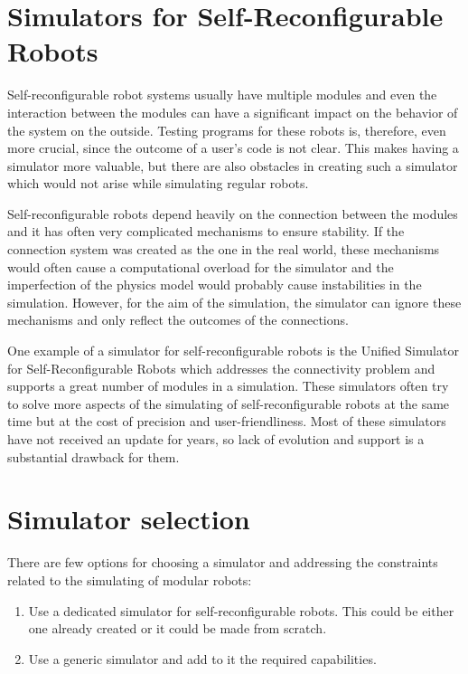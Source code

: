 \documentclass[
  printed, %
  color,   %
  notable, %
  oneside, %
  nolof,   %
  nolot,   %
  nocover,
]{fithesis3}
\begin{document}
\section{Simulators for Self-Reconfigurable Robots}

Self-reconfigurable robot systems usually have multiple modules and even the interaction between the modules can have a significant impact on the behavior of the system on the outside.
Testing programs for these robots is, therefore, even more crucial, since the outcome of a user's code is not clear.
This makes having a simulator more valuable, but there are also obstacles in creating such a simulator which would not arise while simulating regular robots.

Self-reconfigurable robots depend heavily on the connection between the modules and it has often very complicated mechanisms to ensure stability.
If the connection system was created as the one in the real world, these mechanisms would often cause a computational overload for the simulator and the imperfection of the physics model would probably cause instabilities in the simulation.
However, for the aim of the simulation, the simulator can ignore these mechanisms and only reflect the outcomes of the connections.

One example of a simulator for self-reconfigurable robots is the Unified Simulator for Self-Reconfigurable Robots\cite{ussr} which addresses the connectivity problem and supports a great number of modules in a simulation.
These simulators often try to solve more aspects of the simulating of self-reconfigurable robots at the same time but at the cost of precision and user-friendliness.
Most of these simulators have not received an update for years, so lack of evolution and support is a substantial drawback for them.

\section{Simulator selection}

There are few options for choosing a simulator and addressing the constraints related to the simulating of modular robots:
\begin{enumerate}
    \item Use a dedicated simulator for self-reconfigurable robots.
    This could be either one already created or it could be made from scratch.
    \item Use a generic simulator and add to it the required capabilities.
\end{enumerate}
\end{document}

